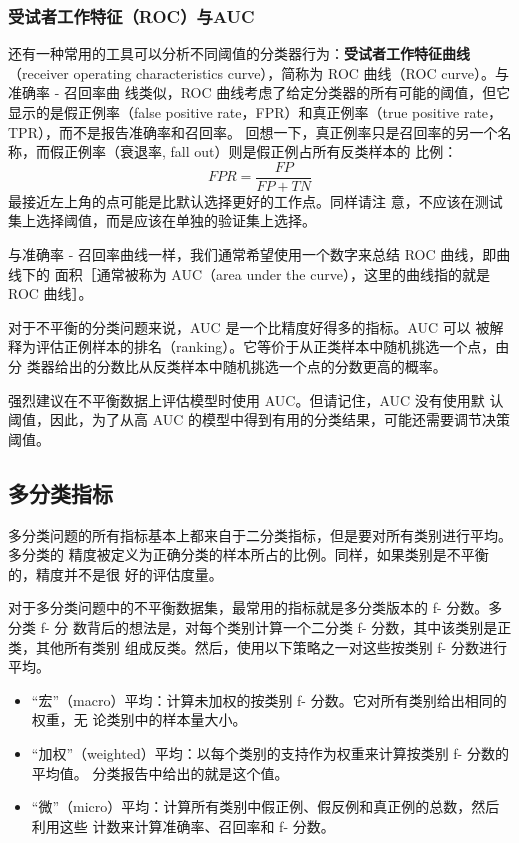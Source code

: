 \subsubsection{受试者工作特征（ROC）与AUC}

还有一种常用的工具可以分析不同阈值的分类器行为：\textbf{受试者工作特征曲线}（receiver
operating characteristics curve），简称为 ROC 曲线（ROC curve）。与准确率 - 召回率曲
线类似，ROC 曲线考虑了给定分类器的所有可能的阈值，但它显示的是假正例率（false
positive rate，FPR）和真正例率（true positive rate，TPR），而不是报告准确率和召回率。
回想一下，真正例率只是召回率的另一个名称，而假正例率（衰退率, fall out）则是假正例占所有反类样本的
比例：
\begin{equation*}
    FPR=\frac{FP}{FP+TN}
\end{equation*}
最接近左上角的点可能是比默认选择更好的工作点。同样请注
意，不应该在测试集上选择阈值，而是应该在单独的验证集上选择。

与准确率 - 召回率曲线一样，我们通常希望使用一个数字来总结 ROC 曲线，即曲线下的
面积［通常被称为 AUC（area under the curve），这里的曲线指的就是 ROC 曲线］。

对于不平衡的分类问题来说，AUC 是一个比精度好得多的指标。AUC 可以
被解释为评估正例样本的排名（ranking）。它等价于从正类样本中随机挑选一个点，由分
类器给出的分数比从反类样本中随机挑选一个点的分数更高的概率。

强烈建议在不平衡数据上评估模型时使用 AUC。但请记住，AUC 没有使用默
认阈值，因此，为了从高 AUC 的模型中得到有用的分类结果，可能还需要调节决策阈值。
\subsection{多分类指标}
多分类问题的所有指标基本上都来自于二分类指标，但是要对所有类别进行平均。多分类的
精度被定义为正确分类的样本所占的比例。同样，如果类别是不平衡的，精度并不是很
好的评估度量。

对于多分类问题中的不平衡数据集，最常用的指标就是多分类版本的 f- 分数。多分类 f- 分
数背后的想法是，对每个类别计算一个二分类 f- 分数，其中该类别是正类，其他所有类别
组成反类。然后，使用以下策略之一对这些按类别 f- 分数进行平均。

\begin{itemize}
    \item “宏”（macro）平均：计算未加权的按类别 f- 分数。它对所有类别给出相同的权重，无
          论类别中的样本量大小。
    \item “加权”（weighted）平均：以每个类别的支持作为权重来计算按类别 f- 分数的平均值。
          分类报告中给出的就是这个值。
    \item “微”（micro）平均：计算所有类别中假正例、假反例和真正例的总数，然后利用这些
          计数来计算准确率、召回率和 f- 分数。
\end{itemize}

